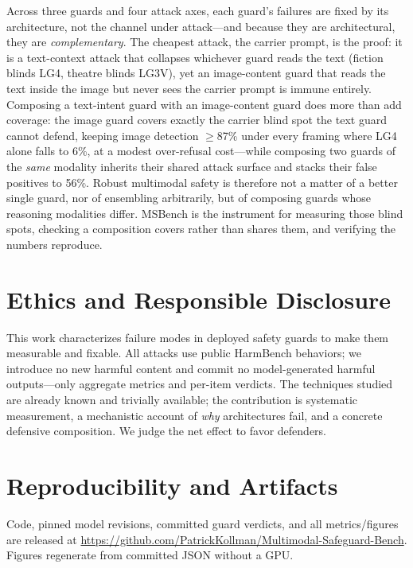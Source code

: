\documentclass[11pt]{article}
\begin{document}
Across three guards and four attack axes, each guard's failures are fixed by its architecture, not the channel under attack---and because they are architectural, they are \emph{complementary}. The cheapest attack, the carrier prompt, is the proof: it is a text-context attack that collapses whichever guard reads the text (fiction blinds LG4, theatre blinds LG3V), yet an image-content guard that reads the text inside the image but never sees the carrier prompt is immune entirely. Composing a text-intent guard with an image-content guard does more than add coverage: the image guard covers exactly the carrier blind spot the text guard cannot defend, keeping image detection $\geq$87\% under every framing where LG4 alone falls to 6\%, at a modest over-refusal cost---while composing two guards of the \emph{same} modality inherits their shared attack surface and stacks their false positives to 56\%. Robust multimodal safety is therefore not a matter of a better single guard, nor of ensembling arbitrarily, but of composing guards whose reasoning modalities differ. MSBench is the instrument for measuring those blind spots, checking a composition covers rather than shares them, and verifying the numbers reproduce.

\section*{Ethics and Responsible Disclosure}
This work characterizes failure modes in deployed safety guards to make them measurable and fixable. All attacks use public HarmBench behaviors; we introduce no new harmful content and commit no model-generated harmful outputs---only aggregate metrics and per-item verdicts. The techniques studied are already known and trivially available; the contribution is systematic measurement, a mechanistic account of \emph{why} architectures fail, and a concrete defensive composition. We judge the net effect to favor defenders.

\section*{Reproducibility and Artifacts}
Code, pinned model revisions, committed guard verdicts, and all metrics/figures are released at \url{https://github.com/PatrickKollman/Multimodal-Safeguard-Bench}. Figures regenerate from committed JSON without a GPU.




\appendix
\end{document}
